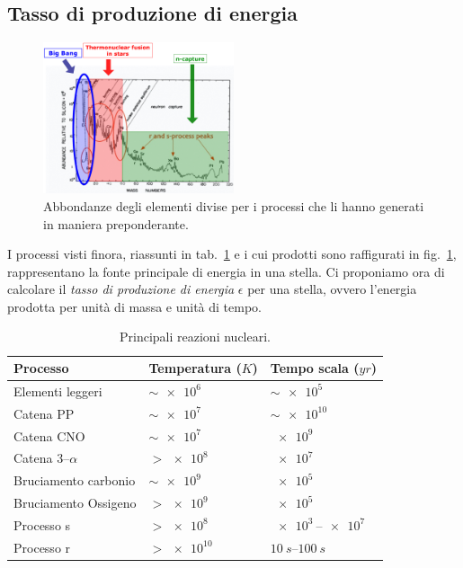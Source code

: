 \subsection{Tasso di produzione di energia}

\begin{figure}[tb]
    \centering
    \includegraphics[width=0.5\textwidth]{immagini/processi-produzione-energia.png}
    \caption{Abbondanze degli elementi divise per i processi che li hanno generati in maniera preponderante.}
    \label{fig:processi-produzione-energia}
\end{figure}

I processi visti finora, riassunti in tab.~\ref{tab:processi-produzione-energia} e i cui prodotti sono raffigurati in fig.~\ref{fig:processi-produzione-energia}, rappresentano la fonte principale di energia in una stella. Ci proponiamo ora di calcolare il \emph{tasso di produzione di energia} $\epsilon$ per una stella, ovvero l'energia prodotta per unità di massa e unità di tempo. 

\begin{table}
\caption{Principali reazioni nucleari.}
\label{tab:processi-produzione-energia}
\centering
\begin{tabular}{lll}
\toprule
Processo & Temperatura ($\si{K}$) & Tempo scala  ($\si{yr}$)\\
\midrule
Elementi leggeri & $\sim \SI{e6}{}$ & $\sim \SI{e5}{}$ \\
Catena PP & $\sim \SI{e7}{}$ & $\sim \SI{e10}{}$ \\
Catena CNO & $\sim \SI{e7}{}$ & $ \SI{e9}{}$\\
Catena 3--$\alpha$ & $> \SI{e8}{}$ & $\SI{e7}{}$ \\
Bruciamento carbonio & $\sim \SI{e9}{}$ & $\SI{e5}{}$ \\
Bruciamento Ossigeno & $> \SI{e9}{}$ & $\SI{e5}{}$ \\
Processo s & $> \SI{e8}{}$ & $\SI{e3}{}$--$\SI{e7}{}$ \\
Processo r & $> \SI{e10}{}$ & $\SI{10}{s}$--$\SI{100}{s}$ \\
\bottomrule
\end{tabular}
\end{table}

